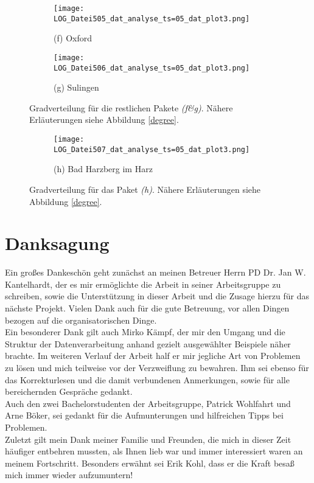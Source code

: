 \documentclass[fontsize=11pt, twoside, a4paper]{scrartcl}
\begin{document}
\begin{figure}	
		\begin{minipage}[t]{0.75\textwidth}
		\begin{figure}[H]
		\texttt{[image: LOG\_Datei505\_dat\_analyse\_ts=05\_dat\_plot3.png]}
		\caption*{(f) Oxford}
		\end{figure}
	\end{minipage}
	\begin{minipage}[t]{0.75\textwidth}
		\begin{figure}[H]
		\texttt{[image: LOG\_Datei506\_dat\_analyse\_ts=05\_dat\_plot3.png]}
		\caption*{(g) Sulingen}
		\end{figure}
	\end{minipage}
\caption{Gradverteilung für die restlichen Pakete \textit{(f\&g)}. Nähere Erläuterungen siehe Abbildung \ref{degree}.}
\end{figure}

\begin{figure}
	\begin{minipage}[t]{0.75\textwidth}
		\begin{figure}[H]
		\texttt{[image: LOG\_Datei507\_dat\_analyse\_ts=05\_dat\_plot3.png]}
		\caption*{(h) Bad Harzberg im Harz}
		\end{figure}
	\end{minipage}
\caption{Gradverteilung für das Paket \textit{(h)}. Nähere Erläuterungen siehe Abbildung \ref{degree}.}
\end{figure}
\newpage
\section{Danksagung}
Ein großes Dankeschön geht zunächst an meinen Betreuer Herrn PD Dr. Jan W. Kantelhardt, der es mir ermöglichte die Arbeit in seiner Arbeitsgruppe zu schreiben, sowie die Unterstützung in dieser Arbeit und die Zusage hierzu für das nächste Projekt. Vielen Dank auch für die gute Betreuung, vor allen Dingen bezogen auf die organisatorischen Dinge.\\[\baselineskip]
Ein besonderer Dank gilt auch Mirko Kämpf, der mir den Umgang und die Struktur der Datenverarbeitung anhand gezielt ausgewählter Beispiele näher brachte. Im weiteren Verlauf der Arbeit half er mir jegliche Art von Problemen zu lösen und mich teilweise vor der Verzweiflung zu bewahren. Ihm sei ebenso für das Korrekturlesen und die damit verbundenen Anmerkungen, sowie für alle bereichernden Gespräche gedankt.\\[\baselineskip] 
Auch den zwei Bachelorstudenten der Arbeitsgruppe, Patrick Wohlfahrt und Arne Böker, sei gedankt für die Aufmunterungen und hilfreichen Tipps bei Problemen.\\[\baselineskip]
Zuletzt gilt mein Dank meiner Familie und Freunden, die mich in dieser Zeit häufiger entbehren mussten, als Ihnen lieb war und immer interessiert waren an meinem Fortschritt. Besonders erwähnt sei Erik Kohl, dass er die Kraft besaß mich immer wieder aufzumuntern!
\newpage
\end{document}
